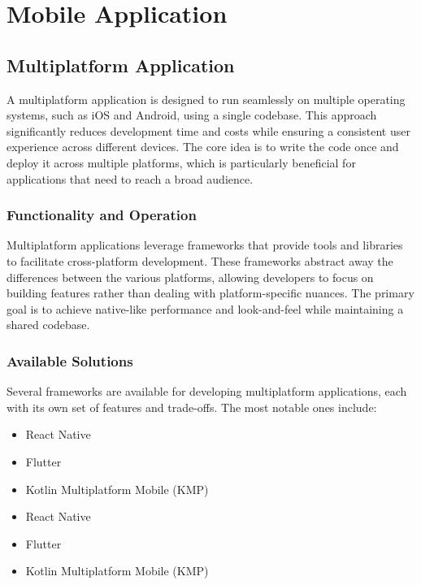 \section{Mobile Application}\label{sec:mobile-application}

\subsection{Multiplatform Application}\label{sec:multiplatform-application}

A multiplatform application is designed to run seamlessly on multiple operating systems, such as iOS and Android, using a single codebase. This approach significantly reduces development time and costs while ensuring a consistent user experience across different devices. The core idea is to write the code once and deploy it across multiple platforms, which is particularly beneficial for applications that need to reach a broad audience.

\subsubsection{Functionality and Operation}

Multiplatform applications leverage frameworks that provide tools and libraries to facilitate cross-platform development. These frameworks abstract away the differences between the various platforms, allowing developers to focus on building features rather than dealing with platform-specific nuances. The primary goal is to achieve native-like performance and look-and-feel while maintaining a shared codebase.

\subsubsection{Available Solutions}

Several frameworks are available for developing multiplatform applications, each with its own set of features and trade-offs. The most notable ones include:

\begin{itemize}
    \item React Native\cite{ReactNativeBook}
    \item Flutter\cite{Flutter}
    \item Kotlin Multiplatform Mobile (KMP)\cite{KMP}
    \item React Native\cite{ReactNativeBook}
    \item Flutter\cite{Flutter}
    \item Kotlin Multiplatform Mobile (KMP)\cite{KMP}
\end{itemize}


